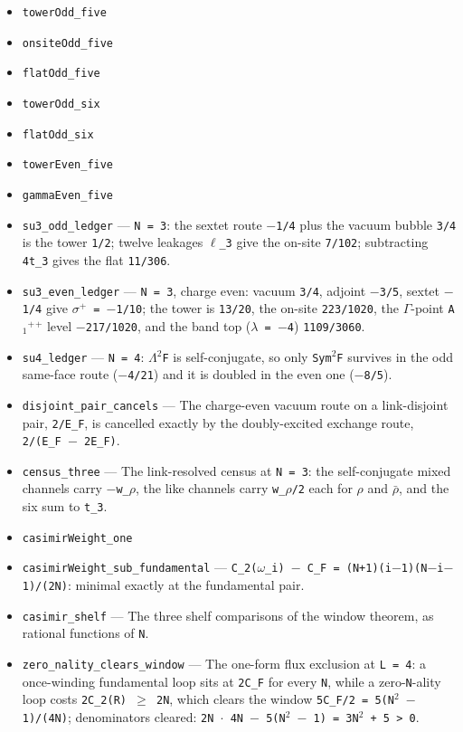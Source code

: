 \documentclass[11pt]{article}
\theoremstyle{plain}
\theoremstyle{definition}
\theoremstyle{remark}
\begin{document}
\begin{itemize}
\item \texttt{towerOdd\_five}
\item \texttt{onsiteOdd\_five}
\item \texttt{flatOdd\_five}
\item \texttt{towerOdd\_six}
\item \texttt{flatOdd\_six}
\item \texttt{towerEven\_five}
\item \texttt{gammaEven\_five}
\item \texttt{su3\_odd\_ledger} --- \texttt{N = 3}: the sextet route \texttt{$-$1/4} plus the vacuum bubble \texttt{3/4} is the tower \texttt{1/2}; twelve leakages \texttt{$\ell$\_3} give the on-site \texttt{7/102}; subtracting \texttt{4t\_3} gives the flat \texttt{11/306}.
\item \texttt{su3\_even\_ledger} --- \texttt{N = 3}, charge even: vacuum \texttt{3/4}, adjoint \texttt{$-$3/5}, sextet \texttt{$-$1/4} give \texttt{$\sigma$$^+$ = $-$1/10}; the tower is \texttt{13/20}, the on-site \texttt{223/1020}, the \texttt{$\Gamma$}-point \texttt{A$_1$$^+$$^+$} level \texttt{$-$217/1020}, and the band top (\texttt{$\lambda$ = $-$4}) \texttt{1109/3060}.
\item \texttt{su4\_ledger} --- \texttt{N = 4}: \texttt{$\Lambda$$^2$F} is self-conjugate, so only \texttt{Sym$^2$F} survives in the odd same-face route (\texttt{$-$4/21}) and it is doubled in the even one (\texttt{$-$8/5}).
\item \texttt{disjoint\_pair\_cancels} --- The charge-even vacuum route on a link-disjoint pair, \texttt{2/E\_F}, is cancelled exactly by the doubly-excited exchange route, \texttt{2/(E\_F $-$ 2E\_F)}.
\item \texttt{census\_three} --- The link-resolved census at \texttt{N = 3}: the self-conjugate mixed channels carry \texttt{$-$w\_$\rho$}, the like channels carry \texttt{w\_$\rho$/2} each for \texttt{$\rho$} and \texttt{$\bar\rho$}, and the six sum to \texttt{t\_3}.
\item \texttt{casimirWeight\_one}
\item \texttt{casimirWeight\_sub\_fundamental} --- \texttt{C\_2($\omega$\_i) $-$ C\_F = (N+1)(i$-$1)(N$-$i$-$1)/(2N)}: minimal exactly at the fundamental pair.
\item \texttt{casimir\_shelf} --- The three shelf comparisons of the window theorem, as rational functions of \texttt{N}.
\item \texttt{zero\_nality\_clears\_window} --- The one-form flux exclusion at \texttt{L = 4}: a once-winding fundamental loop sits at \texttt{2C\_F} for every \texttt{N}, while a zero-\texttt{N}-ality loop costs \texttt{2C\_2(R) $\ge$ 2N}, which clears the window \texttt{5C\_F/2 = 5(N$^2$ $-$ 1)/(4N)}; denominators cleared: \texttt{2N $\cdot$ 4N $-$ 5(N$^2$ $-$ 1) = 3N$^2$ + 5 > 0}.

\end{itemize}
\end{document}
